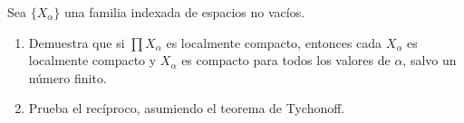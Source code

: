
\item Sea $\{X_\alpha\}$ una familia indexada de espacios no vacíos.
    \begin{enumerate}
        \item Demuestra que si $\prod X_\alpha$ es localmente compacto, entonces cada $X_\alpha$ es localmente compacto y $X_\alpha$ es compacto para todos los valores de $\alpha$, salvo un número finito.
        \item Prueba el recíproco, asumiendo el teorema de Tychonoff.
    \end{enumerate}